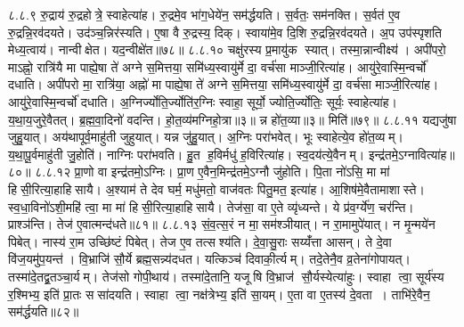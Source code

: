 ८.८.९
रु॒द्राय॑ रु॒द्रहोत्रे॒ स्वाहेत्या॑ह। रु॒द्रमे॒व भा॑ग॒धेये॑न॒ सम॑र्द्धयति। स॒र्वतः॒ सम॑नक्ति। स॒र्वत॑ ए॒व रु॒द्रन्नि॒रव॑दयते। उद॑ञ्च॒न्निर॑स्यति। ए॒षा वै रु॒द्रस्य॒ दिक्। स्वाया॑मे॒व दि॒शि रु॒द्रन्नि॒रव॑दयते। अ॒प उप॑स्पृशति मेध्य॒त्वाय॑। नान्वीक्षेत। यद॒न्वीक्षे॑त॥७८॥
८.८.१०
चक्षु॑रस्य प्र॒मायु॑क स्यात्। तस्मा॒न्नान्वीक्ष्य॑। अपी॑परो॒ माऽह्नो॒ रात्रि॑यै मा पाह्ये॒षा ते॑ अग्ने स॒मित्तया॒ समि॑ध्य॒स्वायु॑र्मे दा॒ वर्च॑सा माञ्जी॒रित्या॑ह। आयु॑रे॒वास्मि॒न्वर्चो॑ दधाति। अपी॑परो मा॒ रात्रि॑या॒ अह्नो॑ मा पाह्ये॒षा ते॑ अग्ने स॒मित्तया॒ समि॑ध्य॒स्वायु॑र्मे दा॒ वर्च॑सा माञ्जी॒रित्या॑ह। आयु॑रे॒वास्मि॒न्वर्चो॑ दधाति। अ॒ग्निर्ज्योति॒र्ज्योति॑र॒ग्निः स्वाहा॒ सूर्यो॒ ज्योति॒र्ज्योतिः॒ सूर्यः॒ स्वाहेत्या॑ह। य॒था॒य॒जुरे॒वैतत्। ब्र॒ह्म॒वा॒दिनो॑ वदन्ति। हो॒त॒व्य॑मग्निहो॒त्रा॥३॥ न्न हो॑त॒व्या॥३॥ मिति॑॥७९॥
८.८.११
यद्यजु॑षा जुहु॒यात्। अय॑थापूर्व॒माहु॑ती जुहुयात्। यन्न जु॑हु॒यात्। अ॒ग्निः परा॑भवेत्। भूः स्वाहेत्ये॒व हो॑त॒व्यम्। य॒था॒पू॒र्वमाहु॑ती जु॒होति॑। नाग्निः परा॑भवति। हु॒त ह॒विर्मधु॑ ह॒विरित्या॑ह। स्व॒दय॑त्ये॒वैनम्। इन्द्र॑तमे॒ऽग्नावित्या॑ह॥८०॥
८.८.१२
प्रा॒णो वा इन्द्र॑तमो॒ऽग्निः। प्रा॒ण ए॒वैन॒मिन्द्र॑तमे॒ऽग्नौ जु॑होति। पि॒ता नो॑ऽसि॒ मा मा॑ हिसी॒रित्या॒हाहिसायै। अ॒श्याम॑ ते देव घर्म॒ मधु॑मतो॒ वाज॑वतः पितु॒मत॒ इत्या॑ह। आ॒शिष॑मे॒वैतामाशास्ते। स्व॒धा॒विनो॑ऽशी॒महि॑ त्वा॒ मा मा॑ हिसी॒रित्या॒हाहिसायै। तेज॑सा॒ वा ए॒ते व्यृ॑ध्यन्ते। ये प्र॑व॒र्ग्ये॑ण॒ चर॑न्ति। प्राश्ञ॑न्ति। तेज॑ ए॒वात्मन्द॑धते॥८१॥
८.८.१३
सं॒व॒त्स॒रं न मा॒सम॑श्ञीयात्। न रा॒मामुपे॑यात्। न मृ॒न्मये॑न पिबेत्। नास्य॑ रा॒म उच्छि॑ष्टं पिबेत्। तेज ए॒व तत्सश्य॑ति। दे॒वा॒सु॒राः सय्यँ॑त्ता आसन्। ते दे॒वा वि॑ज॒यमु॑प॒यन्त॑। वि॒भ्राजि॑ सौ॒र्ये ब्रह्म॒सन्न्य॑दधत। यत्किञ्च॑ दिवाकी॒र्त्यम्। तदे॒तेनै॒व व्र॒तेना॑गोपायत्। तस्मा॑दे॒तद्व्र॒तञ्चा॒र्यम्। तेज॑सो गोपी॒थाय॑। तस्मा॑दे॒तानि॒ यजूषि वि॒भ्राज॑ सौ॒र्यस्येत्या॑हुः। स्वाहा त्वा॒ सूर्य॑स्य र॒श्मिभ्य॒ इति॑ प्रा॒तः ससा॑दयति। स्वाहा त्वा॒ नक्ष॑त्रेभ्य॒ इति॑ सा॒यम्। ए॒ता वा ए॒तस्य॑ दे॒वता। ताभि॑रे॒वैन॒ सम॑र्द्धयति॥८२॥
\anuvakamend

